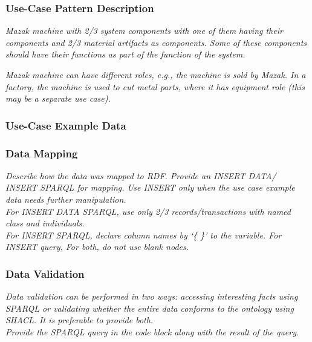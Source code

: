 \subsubsection*{Use-Case Pattern Description}

\textit{Mazak machine with 2/3 system components with one of them having their components and 2/3 material artifacts as components. Some of these components should have their functions as part of the function of the system.}


 
\textit{Mazak machine can have different roles, e.g., the machine is sold by Mazak. In a factory, the machine is used to cut metal parts, where it has equipment role (this may be a separate use case).}

\subsubsection*{Use-Case Example Data}


\subsubsection*{Data Mapping}
 \textit{ 
Describe how the data was mapped to RDF. Provide an INSERT DATA/ INSERT SPARQL for mapping. Use INSERT only when the use case example data needs further manipulation. \\
For INSERT DATA SPARQL, use only 2/3 records/transactions with named class and individuals. \\
For INSERT SPARQL, declare column names by `\{ \}' to the variable.  
For INSERT query, 
For both, do not use blank nodes.    
  }

\subsubsection*{Data Validation}
 \textit{ 
Data validation can be performed in two ways: accessing interesting facts using SPARQL or validating whether the entire data conforms to the ontology using SHACL. It is preferable to provide both. \\
Provide the SPARQL query in the code block along with the result of the query. \\
  }